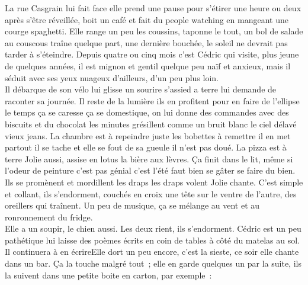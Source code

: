 \documentclass{article}
\begin{document}
La rue Casgrain lui fait face elle
prend une pause pour s’étirer une heure ou deux après s’être
réveillée, boit un café et fait du people watching en mangeant une
courge spaghetti. Elle range un peu les coussins, taponne le tout, un
bol de salade au couscous traîne quelque part, une dernière bouchée,
le soleil ne devrait pas tarder à s’éteindre. Depuis quatre ou cinq
mois c’est Cédric qui visite, plus jeune de quelques années, il est
mignon et gentil quelque peu naïf et anxieux, mais il séduit avec ses
yeux nuageux d’ailleurs, d’un peu plus loin.\\

Il débarque de son vélo lui glisse un sourire s’assied a terre lui
demande de raconter sa journée. Il reste de la lumière ils en
profitent pour en faire de l’ellipse le temps ça se caresse ça se
domestique, on lui donne des commandes avec des biscuits et du
chocolat les minutes grésillent comme un bruit blanc le ciel délavé
vieux jeans. La chambre est à repeindre juste les bobettes à remettre
il en met partout il se tache et elle se fout de sa gueule il n’est
pas doué. La pizza est à terre Jolie aussi, assise en lotus la bière
aux lèvres.  Ça finit dans le lit, même si l’odeur de peinture c’est
pas génial c’est l’été faut bien se gâter se faire du bien. Ils se
promènent et mordillent les draps les draps volent Jolie chante. C’est
simple et collant, ils s’endorment, couchés en croix une tête sur le
ventre de l’autre, des oreillers qui traînent. Un peu de musique, ça
se mélange au vent et au ronronnement du fridge.\\

Elle a un soupir, le chien aussi. Les deux rient, ils s’endorment.
\clearpage
Cédric est un peu pathétique lui laisse des poèmes écrits en coin de
tables à côté du matelas au sol. Il continuera à en écrireElle dort un peu encore, c’est la
sieste, ce soir elle chante dans un bar. Ça la touche malgré tout ;
elle en garde quelques un par la suite, ils la suivent dans une petite
boite en carton, par exemple :\\
\end{document}

